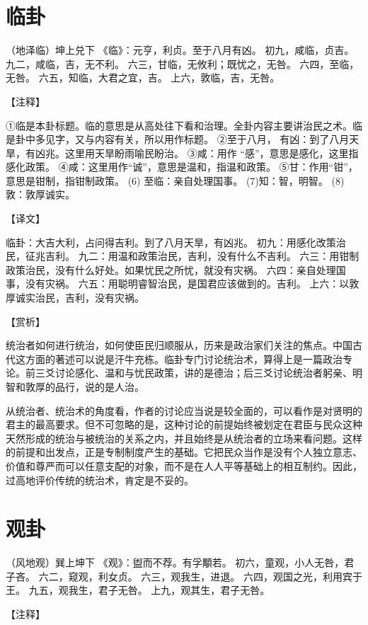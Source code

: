 \documentclass[12pt,UTF8]{ctexbook}
\begin{document}
\chapter{临卦}

（地泽临）坤上兑下
《临》：元亨，利贞。至于八月有凶。
初九，咸临，贞吉。
九二，咸临，吉，无不利。
六三，甘临，无攸利；既忧之，无咎。
六四，至临，无咎。
六五，知临，大君之宜，吉。
上六，敦临，吉，无咎。

【注释】

①临是本卦标题。临的意思是从高处往下看和治理。全卦内容主要讲治民之术。临是卦中多见字，又与内容有关，所以用作标题。
②至于八月， 有凶：到了八月天旱，有凶兆。这里用天旱盼雨喻民盼治。
③咸：用作 “感”，意思是感化，这里指感化政策。
④咸：这里用作“诚”，意思是温和，指温和政策。
⑤甘：作用“钳”，意思是钳制，指钳制政策。
(6) 至临：亲自处理国事。
(7)知：智，明智。
(8)敦：敦厚诚实。

【译文】

临卦：大吉大利，占问得吉利。到了八月天旱，有凶兆。
初九：用感化改策治民，征兆吉利。
九二：用温和政策治民，吉利，没有什么不吉利。
六三：用钳制政策治民，没有什么好处。如果忧民之所忧，就没有灾祸。
六四：亲自处理国事，没有灾祸。
六五：用聪明睿智治民，是国君应该做到的。吉利。
上六：以敦厚诚实治民，吉利，没有灾祸。

【赏析】

统治者如何进行统治，如何使臣民归顺服从，历来是政治家们关注的焦点。中国古代这方面的著述可以说是汗牛充栋。临卦专门讨论统治术，算得上是一篇政治专论。前三爻讨论感化、温和与忧民政策，讲的是德治；后三爻讨论统治者躬亲、明智和敦厚的品行，说的是人治。

从统治者、统治术的角度看，作者的讨论应当说是较全面的，可以看作是对贤明的君主的最高要求。但不可忽略的是，这种讨论的前提始终被划定在君臣与民众这种天然形成的统治与被统治的关系之内，并且始终是从统治者的立场来看问题。这样的前提和出发点，正是专制制度产生的基础。它把民众当作是没有个人独立意志、价值和尊严而可以任意支配的对象，而不是在人人平等基础上的相互制约。因此，过高地评价传统的统治术，肯定是不妥的。

\chapter{观卦}

（风地观）巽上坤下
《观》：盥而不荐。有孚顒若。
初六，童观，小人无咎，君子吝。
六二，窥观，利女贞。
六三，观我生，进退。
六四，观国之光，利用宾于王。
九五，观我生，君子无咎。
上九，观其生，君子无咎。

【注释】
\end{document}
